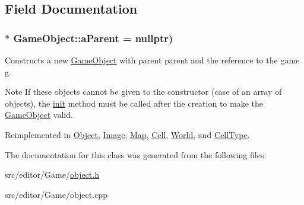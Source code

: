 \subsection{\-Field \-Documentation}
\hypertarget{class_game_object_a41d4afe43f955e78ede0bbd4ad8957f8}{
\subsubsection[{a\-Parent}]{ $\ast$ {\bf \-Game\-Object\-::a\-Parent} = nullptr)}}\label{class_game_object_a41d4afe43f955e78ede0bbd4ad8957f8}
\-Constructs a new \hyperlink{class_game_object}{\-Game\-Object} with parent {\ttfamily parent} and the reference to the game {\ttfamily g}.

\begin{DoxyNote}{\-Note}
\-If these objects cannot be given to the constructor (case of an array of objects), the \hyperlink{class_game_object_a97be7b59b2e76e7d60de2146b894eed9}{init} method must be called after the creation to make the \hyperlink{class_game_object}{\-Game\-Object} valid. 
\end{DoxyNote}


\-Reimplemented in \hyperlink{class_object_a4b9173b5a9a1e5c313df5b574716037a}{\-Object}, \hyperlink{class_image_ae2af89a54e82c3002f0feb8a25ca714b}{\-Image}, \hyperlink{class_map_ac0d4bf203db2a4372ea6923729f978f1}{\-Map}, \hyperlink{class_cell_ab1ecd1ed6ff618f6a7195f817bc0cef2}{\-Cell}, \hyperlink{class_world_af24924a1b6c6596b1c0a293651ffccaf}{\-World}, and \hyperlink{class_cell_type_a7ac20d29216624b54218a54bde6593f2}{\-Cell\-Type}.



\-The documentation for this class was generated from the following files\-:\begin{DoxyCompactItemize}
\item 
src/editor/\-Game/\hyperlink{object_8h}{object.\-h}\item 
src/editor/\-Game/object.\-cpp\end{DoxyCompactItemize}
